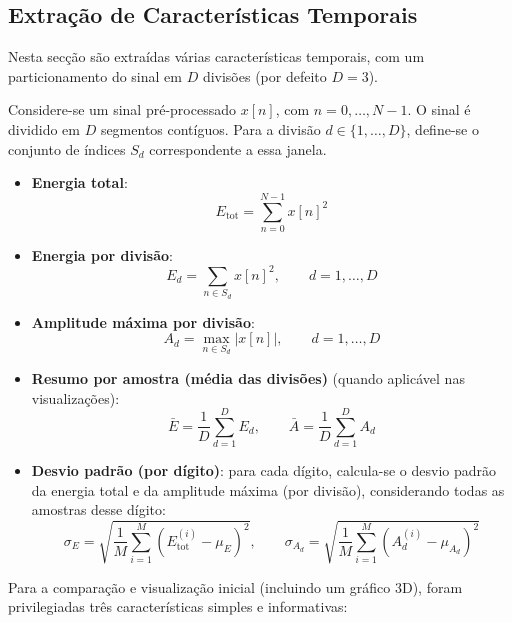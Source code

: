 \documentclass[12pt]{article}
\begin{document}
\subsection{Extração de Características Temporais}

Nesta secção são extraídas várias características temporais, com um particionamento do sinal em $D$ divisões (por defeito $D=3$).

Considere-se um sinal pré-processado $x[n]$, com $n=0,\dots,N-1$. O sinal é dividido em $D$ segmentos contíguos. Para a divisão $d\in\{1,\dots,D\}$, define-se o conjunto de índices $S_d$ correspondente a essa janela.

\begin{itemize}
    \item \textbf{Energia total}:
    \[
    E_{\text{tot}} = \sum_{n=0}^{N-1} x[n]^2
    \]

    \item \textbf{Energia por divisão}:
    \[
    E_d = \sum_{n\in S_d} x[n]^2,\qquad d=1,\dots,D
    \]

    \item \textbf{Amplitude máxima por divisão}:
    \[
    A_d = \max_{n\in S_d} |x[n]|,\qquad d=1,\dots,D
    \]

    \item \textbf{Resumo por amostra (média das divisões)} (quando aplicável nas visualizações):
    \[
    \bar{E} = \frac{1}{D}\sum_{d=1}^{D} E_d,
    \qquad
    \bar{A} = \frac{1}{D}\sum_{d=1}^{D} A_d
    \]

    \item \textbf{Desvio padrão (por dígito)}: para cada dígito, calcula-se o desvio padrão da energia total e da amplitude máxima (por divisão), considerando todas as amostras desse dígito:
\[
\sigma_{E} = \sqrt{\frac{1}{M}\sum_{i=1}^{M}(E_{\text{tot}}^{(i)}-\mu_{E})^2},
\qquad
\sigma_{A_d} = \sqrt{\frac{1}{M}\sum_{i=1}^{M}(A_d^{(i)}-\mu_{A_d})^2}
\]
\end{itemize}

Para a comparação e visualização inicial (incluindo um gráfico 3D), foram privilegiadas três características simples e informativas:
\end{document}
